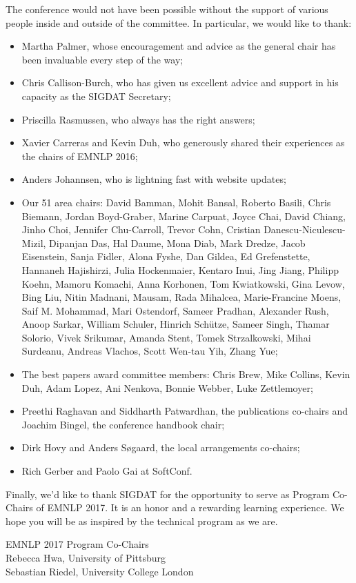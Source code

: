 The conference would not have been possible without the support of various people inside and outside of the committee. In particular, we would like to thank:

\begin{itemize}
 
\item Martha Palmer, whose encouragement and advice as the general chair has been invaluable every step of the way;
\item Chris Callison-Burch, who has given us excellent advice and support in his capacity as the SIGDAT Secretary;
\item Priscilla Rasmussen, who always has the right answers;
\item Xavier Carreras and Kevin Duh, who generously shared their experiences as the chairs of EMNLP 2016; 
\item Anders Johannsen, who is lightning fast with website updates;
\item Our 51 area chairs:  David Bamman, Mohit Bansal, Roberto Basili, Chris Biemann, Jordan Boyd-Graber, Marine Carpuat, Joyce Chai, David Chiang, Jinho Choi, Jennifer Chu-Carroll, Trevor Cohn, Cristian Danescu-Niculescu-Mizil, Dipanjan Das, Hal Daume, Mona Diab, Mark Dredze, Jacob Eisenstein, Sanja Fidler, Alona Fyshe, Dan Gildea, Ed Grefenstette, Hannaneh Hajishirzi, Julia Hockenmaier, Kentaro Inui, Jing Jiang, Philipp Koehn, Mamoru Komachi, Anna Korhonen, Tom Kwiatkowski, Gina Levow, Bing Liu, Nitin Madnani, Mausam, Rada Mihalcea, Marie-Francine Moens, Saif M. Mohammad, Mari Ostendorf, Sameer Pradhan, Alexander Rush, Anoop Sarkar, William Schuler, Hinrich Schütze, Sameer Singh, Thamar Solorio, Vivek Srikumar, Amanda Stent, Tomek Strzalkowski, Mihai Surdeanu, Andreas Vlachos, Scott Wen-tau Yih, Zhang Yue;
\item The best papers award committee members: Chris Brew, Mike Collins, Kevin Duh, Adam Lopez, Ani Nenkova, Bonnie Webber, Luke Zettlemoyer;
\item Preethi Raghavan and Siddharth Patwardhan, the publications co-chairs and Joachim Bingel, the conference handbook chair;
\item Dirk Hovy and Anders Søgaard, the local arrangements co-chairs;
\item Rich Gerber and Paolo Gai at SoftConf.
 
\end{itemize}
Finally, we’d like to thank SIGDAT for the opportunity to serve as Program Co-Chairs of EMNLP 2017. It is an honor and a rewarding learning experience. We hope you will be as inspired by the technical program as we are. 

\vspace{3em}

\noindent EMNLP 2017 Program Co-Chairs \\
Rebecca Hwa, University of Pittsburg\\
Sebastian Riedel, University College London
